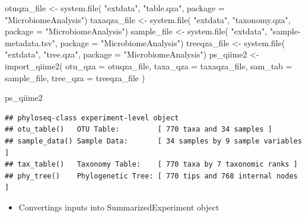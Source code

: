 \documentclass[
]{book}
\newenvironment{Shaded}{\begin{snugshade}}{\end{snugshade}}
\newcommand{\AttributeTok}[1]{\textcolor[rgb]{0.77,0.63,0.00}{#1}}
\newcommand{\FunctionTok}[1]{\textcolor[rgb]{0.00,0.00,0.00}{#1}}
\newcommand{\NormalTok}[1]{#1}
\newcommand{\OtherTok}[1]{\textcolor[rgb]{0.56,0.35,0.01}{#1}}
\newcommand{\StringTok}[1]{\textcolor[rgb]{0.31,0.60,0.02}{#1}}
\providecommand{\tightlist}{%
  \setlength{\itemsep}{0pt}\setlength{\parskip}{0pt}}
\begin{document}
\begin{Shaded}
\begin{Highlighting}[]
\NormalTok{otuqza\_file }\OtherTok{\textless{}{-}} \FunctionTok{system.file}\NormalTok{(}
    \StringTok{"extdata"}\NormalTok{, }\StringTok{"table.qza"}\NormalTok{,}
    \AttributeTok{package =} \StringTok{"MicrobiomeAnalysis"}\NormalTok{)}
\NormalTok{taxaqza\_file }\OtherTok{\textless{}{-}} \FunctionTok{system.file}\NormalTok{(}
    \StringTok{"extdata"}\NormalTok{, }\StringTok{"taxonomy.qza"}\NormalTok{,}
    \AttributeTok{package =} \StringTok{"MicrobiomeAnalysis"}\NormalTok{)}
\NormalTok{sample\_file }\OtherTok{\textless{}{-}} \FunctionTok{system.file}\NormalTok{(}
    \StringTok{"extdata"}\NormalTok{, }\StringTok{"sample{-}metadata.tsv"}\NormalTok{,}
    \AttributeTok{package =} \StringTok{"MicrobiomeAnalysis"}\NormalTok{)}
\NormalTok{treeqza\_file }\OtherTok{\textless{}{-}} \FunctionTok{system.file}\NormalTok{(}
    \StringTok{"extdata"}\NormalTok{, }\StringTok{"tree.qza"}\NormalTok{,}
    \AttributeTok{package =} \StringTok{"MicrobiomeAnalysis"}\NormalTok{)}
\NormalTok{ps\_qiime2 }\OtherTok{\textless{}{-}} \FunctionTok{import\_qiime2}\NormalTok{(}
    \AttributeTok{otu\_qza =}\NormalTok{ otuqza\_file, }\AttributeTok{taxa\_qza =}\NormalTok{ taxaqza\_file,}
    \AttributeTok{sam\_tab =}\NormalTok{ sample\_file, }\AttributeTok{tree\_qza =}\NormalTok{ treeqza\_file}
\NormalTok{)}

\NormalTok{ps\_qiime2}
\end{Highlighting}
\end{Shaded}

\begin{verbatim}
## phyloseq-class experiment-level object
## otu_table()   OTU Table:         [ 770 taxa and 34 samples ]
## sample_data() Sample Data:       [ 34 samples by 9 sample variables ]
## tax_table()   Taxonomy Table:    [ 770 taxa by 7 taxonomic ranks ]
## phy_tree()    Phylogenetic Tree: [ 770 tips and 768 internal nodes ]
\end{verbatim}

\begin{itemize}
\tightlist
\item
  Convertings inputs into SummarizedExperiment object
\end{itemize}
\end{document}
